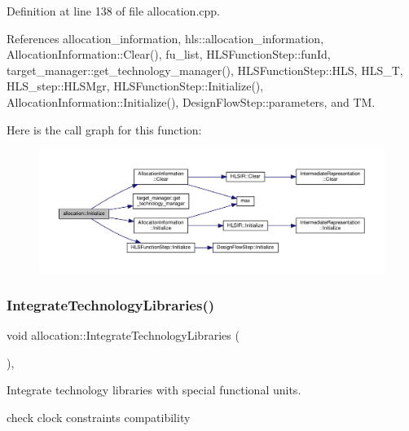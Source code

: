 Definition at line 138 of file allocation.\+cpp.



References allocation\+\_\+information, hls\+::allocation\+\_\+information, Allocation\+Information\+::\+Clear(), fu\+\_\+list, H\+L\+S\+Function\+Step\+::fun\+Id, target\+\_\+manager\+::get\+\_\+technology\+\_\+manager(), H\+L\+S\+Function\+Step\+::\+H\+LS, H\+L\+S\+\_\+T, H\+L\+S\+\_\+step\+::\+H\+L\+S\+Mgr, H\+L\+S\+Function\+Step\+::\+Initialize(), Allocation\+Information\+::\+Initialize(), Design\+Flow\+Step\+::parameters, and TM.

Here is the call graph for this function\+:
\nopagebreak
\begin{figure}[H]
\begin{center}
\leavevmode
\includegraphics[width=350pt]{d0/d74/classallocation_a448e4e0cc7e3444fb3479f211d0b637e_cgraph}
\end{center}
\end{figure}
\mbox{\label{classallocation_a2a1bfe82ec889179c591b1ebee43464b}} 
\subsubsection{\texorpdfstring{Integrate\+Technology\+Libraries()}{IntegrateTechnologyLibraries()}}
{\footnotesize\ttfamily void allocation\+::\+Integrate\+Technology\+Libraries (\begin{DoxyParamCaption}{ }\end{DoxyParamCaption})\hspace{0.3cm}{\ttfamily [protected]}, {\ttfamily [virtual]}}



Integrate technology libraries with special functional units. 

check clock constraints compatibility

